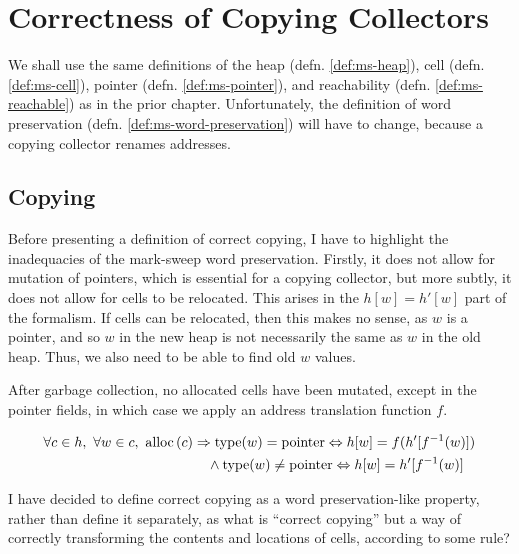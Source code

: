 \chapter{Correctness of Copying Collectors}
\label{sec:copying}

We shall use the same definitions of the \gls{heap}
(defn. \ref{def:ms-heap}), \gls{cell} (defn. \ref{def:ms-cell}),
\gls{pointer} (defn. \ref{def:ms-pointer}), and reachability
(defn. \ref{def:ms-reachable}) as in the prior chapter. Unfortunately,
the definition of word preservation
(defn. \ref{def:ms-word-preservation}) will have to change, because a
\gls{copying} \gls{collector} renames addresses.

\section{Copying}
\label{sec:copying-copying}

Before presenting a definition of correct copying, I have to highlight
the inadequacies of the \gls{mark-sweep} word preservation. Firstly,
it does not allow for mutation of \glspl{pointer}, which is essential
for a \gls{copying} \gls{collector}, but more subtly, it does not
allow for \glspl{cell} to be relocated. This arises in the $h[w] =
h'[w]$ part of the formalism. If \glspl{cell} can be relocated, then
this makes no sense, as $w$ is a \gls{pointer}, and so $w$ in the new
\gls{heap} is not necessarily the same as $w$ in the old
\gls{heap}. Thus, we also need to be able to find old $w$ values.

\begin{definition}
  \label{def:c-correct-copying}
  After garbage collection, no allocated cells have been mutated,
  except in the pointer fields, in which case we apply an address
  translation function $f$.

  \begin{align*}
    \forall c \in h,\ \forall w \in c,\ \mathrm{alloc}\left(c\right) & \Rightarrow
    \mathrm{type}(w) = \mathrm{pointer} \Leftrightarrow h[w] = f(h'[f^{-1}(w)])\\
    &\quad\land \mathrm{type}(w) \neq \mathrm{pointer} \Leftrightarrow h[w] =
    h'[f^{-1}(w)]
  \end{align*}
\end{definition}

I have decided to define correct copying as a word preservation-like
property, rather than define it separately, as what is ``correct
copying'' but a way of correctly transforming the contents and
locations of cells, according to some rule?

